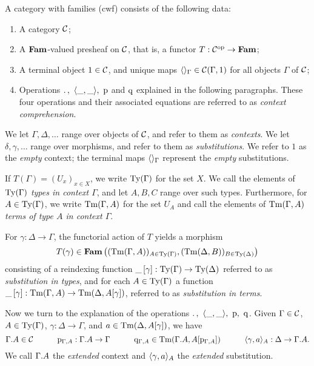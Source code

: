 \documentclass{lmcs}
\begin{document}
\begin{definition}\label{def:Cwfobj} 
A category with families (cwf) consists of the following data:

\begin{enumerate} 

\item A category ${\mathcal C}$; 

\item A $\textbf{Fam}$-valued presheaf on ${\mathcal C}$, that is, a functor
$T : {\mathcal C}^{\text{op}} \to \textbf{Fam}$;

\item A terminal object $1\in {\mathcal C}$, and unique maps
$\langle  \rangle_\Gamma \in {\mathcal C}(\Gamma, 1)$ for all objects $\Gamma$ of ${\mathcal C}$;

\item Operations ${.\,},~\langle \_,\_ \rangle,~\mathrm{p}$ and $\mathrm{q}$ 
explained in the following paragraphs.
These four operations and their associated equations
are referred to as \emph{context comprehension}.
\end{enumerate}

We let $\Gamma, \Delta,\ldots$ range over objects of ${\mathcal C}$, 
and refer to them as \emph{contexts}. 
We let $\delta, \gamma,\ldots$ range over morphisms, 
and refer to them as \emph{substitutions}. 
We refer to $1$ as the \emph{empty} context; the terminal maps
$\langle  \rangle_\Gamma$ represent the \emph{empty} substitutions.

If $T(\Gamma) = (U_x)_{x\in X}$, we write $\mathrm{Ty}(\Gamma)$ for the set $X$.
We call the elements of $\mathrm{Ty}(\Gamma)$ \emph{types in context $\Gamma$}, 
and let $A, B, C$ range over such types. 
Furthermore, for $A \in \mathrm{Ty}(\Gamma)$, we write $\mathrm{Tm}(\Gamma, A)$ for the set $U_A$
and call the elements of $\mathrm{Tm}(\Gamma, A)$ 
\emph{terms of type $A$ in context $\Gamma$}. 

For $\gamma : \Delta \to \Gamma$,
the functorial action of $T$ yields a morphism
\[
T(\gamma) \in  \Fam\left((\Tm(\Gamma, A))_{A\in \Ty(\Gamma)}, %
                (\Tm(\Delta, B))_{B\in \Ty(\Delta)}\right)
\]
consisting of a reindexing function $\_\,[\gamma] : \mathrm{Ty}(\Gamma) \to
\mathrm{Ty}(\Delta)$ referred to as \emph{substitution in types}, and for each $A\in
\mathrm{Ty}(\Gamma)$ a function $\_\,[\gamma] : \mathrm{Tm}(\Gamma, A) \to \mathrm{Tm}(\Delta,
A[\gamma])$, referred to as \emph{substitution in terms}.

Now we turn to the explanation of the operations 
${.\,},~\langle \_,\_ \rangle,~\mathrm{p},~\mathrm{q}$.
Given $\Gamma \in {\mathcal C}$, $A \in \mathrm{Ty}(\Gamma)$, $\gamma : \Delta \to \Gamma$,
and $a\in \mathrm{Tm}(\Delta, A[\gamma])$, we have
\[
\Gamma . A \in {\mathcal C}
\quad\qquad
\mathrm{p}_{\Gamma, A} : \Gamma . A \to \Gamma
\quad\qquad
\mathrm{q}_{\Gamma, A} \in \mathrm{Tm}(\Gamma. A, A[\mathrm{p}_{\Gamma,A}])
\quad\qquad
\langle \gamma, a \rangle_A : \Delta \to \Gamma . A.
\] 
We call $\Gamma . A$ the \emph{extended} context 
and $\langle \gamma, a \rangle_A$ the \emph{extended} substitution.


\end{definition}
\end{document}
